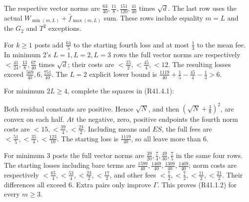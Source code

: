 The respective vector norms are \(\frac{63}{40},\allowbreak \allowbreak \frac{11}{8},\allowbreak \allowbreak \frac{151}{120},\allowbreak \allowbreak \frac{41}{40}\) times \(\sqrt{d}\). The last row uses the actual \(W_{\min(m,\allowbreak \allowbreak L)}+\bar f_{\max(m,\allowbreak \allowbreak L)}\) sum. These rows include equality \(m=L\) and the \(G_{2}\) and \(T^2\) exceptions.

For \(k\ge 1\) posts add \(\frac{64}{5}\) to the starting fourth loss and at most \(\frac{1}{3}\) to the mean fee. In minimum 2's \(L=1,\allowbreak \allowbreak L=2,\allowbreak \allowbreak L=3\) rows the full vector norms are respectively \(<\frac{41}{24},\allowbreak \allowbreak \frac{13}{8},\allowbreak \allowbreak \frac{67}{40}\) times \(\sqrt{d}\); their costs are \(<\frac{25}{2},\allowbreak \allowbreak <\frac{45}{4},\allowbreak \allowbreak <12\). The resulting losses exceed \(\frac{569}{40},\allowbreak \allowbreak 6,\allowbreak \allowbreak \frac{751}{40}\). The \(L=2\) explicit lower bound is \(\frac{1119}{40}+\frac{1}{5}-\frac{45}{4}-\frac{1}{3}>6\).

For minimum \(2 L\ge 4\), complete the squares in (R41.4.1):


Both residual constants are positive. Hence \(\sqrt{N}\), and then \((\sqrt{N}+\frac{3}{8})^2\), are convex on each half. \(At\) the negative, zero, positive endpoints the fourth norm costs are \(<15,\allowbreak \allowbreak <\frac{39}{4},\allowbreak \allowbreak <\frac{23}{2}\). Including means and \(ES\), the full fees are \(<\frac{51}{5},\allowbreak \allowbreak <\frac{35}{4},\allowbreak \allowbreak <\frac{123}{10}\). The starting loss is \(\frac{1119}{40}\), so all leave more than 6.

For minimum 3 posts the full vector norms are \(\frac{39}{20},\allowbreak \allowbreak \frac{7}{4},\allowbreak \allowbreak \frac{49}{30},\allowbreak \allowbreak \frac{7}{5}\) in the same four rows. The starting losses including bare terms are \(\frac{1599}{40},\allowbreak \allowbreak \frac{1469}{40},\allowbreak \allowbreak \frac{1309}{40},\allowbreak \allowbreak \frac{1469}{40}\); norm costs are respectively \(<\frac{65}{4},\allowbreak \allowbreak <\frac{53}{4},\allowbreak \allowbreak <\frac{23}{2},\allowbreak \allowbreak <\frac{17}{2}\), and other fees \(<\frac{7}{2},\allowbreak \allowbreak <\frac{7}{2},\allowbreak \allowbreak <\frac{11}{2},\allowbreak \allowbreak <\frac{21}{2}\). Their differences all exceed 6. Extra pairs only improve \(\Gamma\). This proves (R41.1.2) for every \(m\ge3\).

